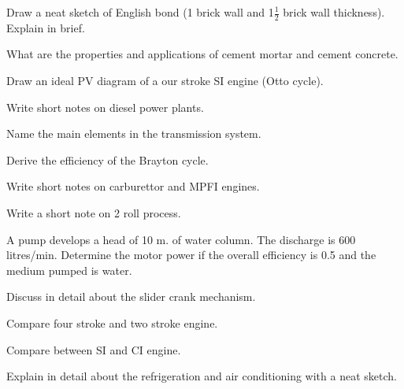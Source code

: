 \ene

\item \iitem Draw a neat sketch of English bond (1 brick wall and 1$\frac{1}{2}$ brick wall
  thickness). Explain in brief.
\Or
\item What are the properties and applications of cement mortar and cement concrete.
\ene

\ene

\newpage \again

\sectionB
\partA

\iitem Draw an ideal PV diagram of a our stroke SI engine (Otto cycle). 
\item Write short notes on diesel power plants. 
\item Name the main elements in the transmission system. \marka

\partBt

\item Derive the efficiency of the Brayton cycle. 
\item Write short notes on carburettor and MPFI engines. 
\item Write a short note on 2 roll process. 

\partCo

\item \iitem A pump develops a head of 10 m. of water column. The discharge is 600 litres/min.
  Determine the motor power if the overall efficiency is 0.5 and the medium pumped is water.
\Or
\item Discuss in detail about the slider crank mechanism.

\ene

\item \iitem \iitem Compare four stroke and two stroke engine. 
\item Compare between SI and CI engine. 
\ene
\Or
\item Explain in detail about the refrigeration and air conditioning with a neat sketch.

\ene \ene
